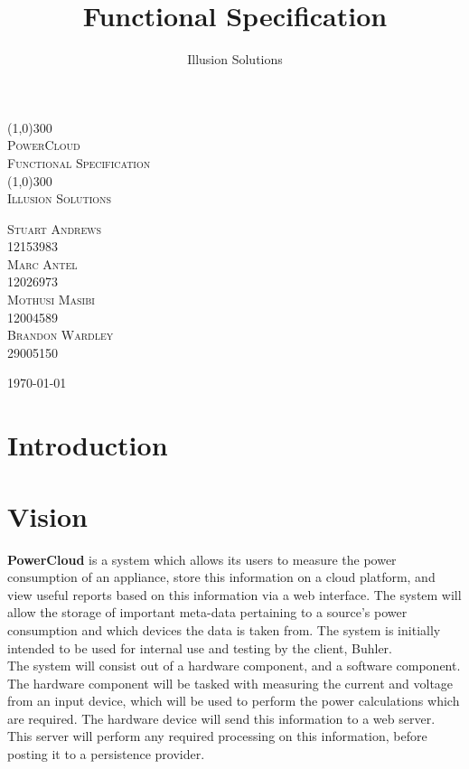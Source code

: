 \documentclass{article}
\title{
	Functional Specification
}
\author{Illusion Solutions}
\begin{document}
	
	\begin{titlepage}
		\begin{center}
			\line(1,0){300} \\
			[0.1cm]
			\textsc{\Huge
				PowerCloud\\
				Functional Specification
			} \\
			[0.1cm]
			\line(1,0){300} \\
			[2.0cm]
			\textsc{\Large
				Illusion Solutions
			} \\
			[3.5cm]
			
		\end{center}
		\begin{flushright}
			\textsc{\Large
				Stuart Andrews\\ 
				12153983\\
				Marc Antel\\
				12026973\\
				Mothusi Masibi\\
				12004589\\
				Brandon Wardley\\
				29005150\\
				[4.0cm]
			}
		\end{flushright}
		\begin{center}
			\today
		\end{center}
	\end{titlepage}
	
	\newpage
	\restoregeometry
	\tableofcontents
	\thispagestyle{empty}
	
	\newpage
	
	\section{Introduction}
	\newpage
	\section{Vision}
	\textbf{PowerCloud} is a system which allows its users to measure the power consumption of an appliance, store this information on a cloud platform, and view useful reports based on this information via a web interface. The system will allow the storage of important meta-data pertaining to a source's power consumption and which devices the data is taken from. The system is initially intended to be used for internal use and testing by the client, Buhler.\\
	
	The system will consist out of a hardware component, and a software component. The hardware component will be tasked with measuring the current and voltage from an input device, which will be used to perform the power calculations which are required. The hardware device will send this information to a web server. This server will perform any required processing on this information, before posting it to a persistence provider.\\
	
\end{document}
